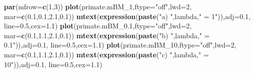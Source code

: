 \documentclass[fleqn,10pt,lineno]{wlpeerj} %
\newenvironment{Shaded}{\begin{snugshade}}{\end{snugshade}}
\newcommand{\AttributeTok}[1]{\textcolor[rgb]{0.13,0.29,0.53}{#1}}
\newcommand{\DecValTok}[1]{\textcolor[rgb]{0.00,0.00,0.81}{#1}}
\newcommand{\FloatTok}[1]{\textcolor[rgb]{0.00,0.00,0.81}{#1}}
\newcommand{\FunctionTok}[1]{\textcolor[rgb]{0.13,0.29,0.53}{\textbf{#1}}}
\newcommand{\NormalTok}[1]{#1}
\newcommand{\StringTok}[1]{\textcolor[rgb]{0.31,0.60,0.02}{#1}}
\begin{document}
\begin{Shaded}
\begin{Highlighting}[]
\FunctionTok{par}\NormalTok{(}\AttributeTok{mfrow=}\FunctionTok{c}\NormalTok{(}\DecValTok{1}\NormalTok{,}\DecValTok{3}\NormalTok{))}
\FunctionTok{plot}\NormalTok{(primate.mBM\_1,}\AttributeTok{ftype=}\StringTok{"off"}\NormalTok{,}\AttributeTok{lwd=}\DecValTok{2}\NormalTok{,}
  \AttributeTok{mar=}\FunctionTok{c}\NormalTok{(}\FloatTok{0.1}\NormalTok{,}\FloatTok{0.1}\NormalTok{,}\FloatTok{2.1}\NormalTok{,}\FloatTok{0.1}\NormalTok{))}
\FunctionTok{mtext}\NormalTok{(}\FunctionTok{expression}\NormalTok{(}\FunctionTok{paste}\NormalTok{(}\StringTok{"a) "}\NormalTok{,lambda,}\StringTok{" = 1"}\NormalTok{)),}\AttributeTok{adj=}\FloatTok{0.1}\NormalTok{,}
  \AttributeTok{line=}\FloatTok{0.5}\NormalTok{,}\AttributeTok{cex=}\FloatTok{1.1}\NormalTok{)}
\FunctionTok{plot}\NormalTok{(primate.mBM\_0}\FloatTok{.1}\NormalTok{,}\AttributeTok{ftype=}\StringTok{"off"}\NormalTok{,}\AttributeTok{lwd=}\DecValTok{2}\NormalTok{,}
  \AttributeTok{mar=}\FunctionTok{c}\NormalTok{(}\FloatTok{0.1}\NormalTok{,}\FloatTok{1.1}\NormalTok{,}\FloatTok{2.1}\NormalTok{,}\FloatTok{0.1}\NormalTok{))}
\FunctionTok{mtext}\NormalTok{(}\FunctionTok{expression}\NormalTok{(}\FunctionTok{paste}\NormalTok{(}\StringTok{"b) "}\NormalTok{,lambda,}\StringTok{" = 0.1"}\NormalTok{)),}\AttributeTok{adj=}\FloatTok{0.1}\NormalTok{,}
  \AttributeTok{line=}\FloatTok{0.5}\NormalTok{,}\AttributeTok{cex=}\FloatTok{1.1}\NormalTok{)}
\FunctionTok{plot}\NormalTok{(primate.mBM\_10,}\AttributeTok{ftype=}\StringTok{"off"}\NormalTok{,}\AttributeTok{lwd=}\DecValTok{2}\NormalTok{,}
  \AttributeTok{mar=}\FunctionTok{c}\NormalTok{(}\FloatTok{0.1}\NormalTok{,}\FloatTok{1.1}\NormalTok{,}\FloatTok{2.1}\NormalTok{,}\FloatTok{0.1}\NormalTok{))}
\FunctionTok{mtext}\NormalTok{(}\FunctionTok{expression}\NormalTok{(}\FunctionTok{paste}\NormalTok{(}\StringTok{"c) "}\NormalTok{,lambda,}\StringTok{" = 10"}\NormalTok{)),}\AttributeTok{adj=}\FloatTok{0.1}\NormalTok{,}
  \AttributeTok{line=}\FloatTok{0.5}\NormalTok{,}\AttributeTok{cex=}\FloatTok{1.1}\NormalTok{)}
\end{Highlighting}
\end{Shaded}
\end{document}
